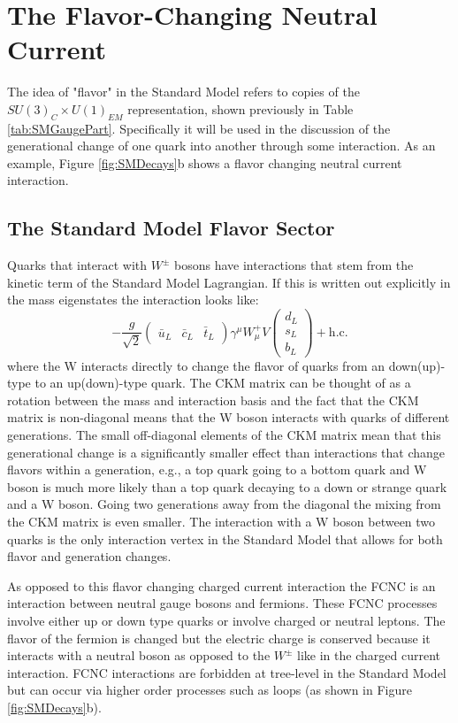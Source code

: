 
\section{The Flavor-Changing Neutral Current}
\label{sec:FCNC}
  The idea of "flavor" in the Standard Model refers to copies of the $SU(3)_C \times U(1)_{EM}$ representation, shown previously in Table \ref{tab:SMGaugePart}.  Specifically it will be used in the discussion of the generational change of one quark into another through some interaction.  As an example, Figure \ref{fig:SMDecays}b shows a flavor changing neutral current interaction.
\subsection{The Standard Model Flavor Sector}
Quarks that interact with $W^\pm$ bosons have interactions that stem from the kinetic term of the Standard Model Lagrangian.  If this is written out explicitly in the mass eigenstates the interaction looks like:
\[ -\frac{g}{\sqrt{2}}\begin{pmatrix} \bar{u}_L & \bar{c}_L &\bar{t}_L \end{pmatrix} \gamma^\mu W_\mu^+ V\begin{pmatrix} d_L\\s_L\\b_L\end{pmatrix}+\text{h.c.}
\]
where the W interacts directly to change the flavor of quarks from an down(up)-type to an up(down)-type quark.  The CKM matrix can be thought of as a rotation between the mass and interaction basis and the fact that the CKM matrix is non-diagonal means that the W boson interacts with quarks of different generations.  The small off-diagonal elements of the CKM matrix mean that this generational change is a significantly smaller effect than interactions that change flavors within a generation, e.g., a top quark going to a bottom quark and W boson is much more likely than a top quark decaying to a down or strange quark and a W boson.  Going two generations away from the diagonal the mixing from the CKM matrix is even smaller.  The interaction with a W boson between two quarks is the only interaction vertex in the Standard Model that allows for both flavor and generation changes.

As opposed to this flavor changing charged current interaction the FCNC is an interaction between neutral gauge bosons and fermions.  These FCNC processes involve either up or down type quarks or involve charged or neutral leptons.  The flavor of the fermion is changed but the electric charge is conserved because it interacts with a neutral boson as opposed to the $W^\pm$ like in the charged current interaction.  FCNC interactions are forbidden at tree-level in the Standard Model but can occur via higher order processes such as loops (as shown in Figure \ref{fig:SMDecays}b).

